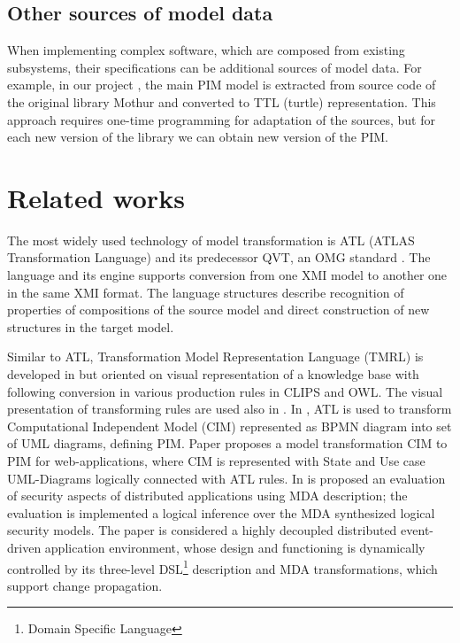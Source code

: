 \documentclass[conference]{IEEEtran}
\begin{document}

\subsection{Other sources of model data}
\label{sec:other-models}

When implementing complex software, which are composed from existing subsystems, their specifications can be additional sources of model data.  For example, in our project \cite{bit2019}, the main PIM model is extracted from source code of the original library Mothur and converted to TTL (turtle) representation.  This approach requires one-time programming for adaptation of the sources, but for each new version of the library we can obtain new version of the PIM.  %



\section{Related works}

The most widely used technology of model transformation is ATL (ATLAS Transformation Language) \cite{atl} and its predecessor QVT, an OMG standard \cite{QVT}.  The language and its engine supports conversion from one XMI model to another one in the same XMI format.  The language structures describe recognition of properties of compositions of the source model and direct construction of new structures in the target model.

Similar to ATL, Transformation Model Representation Language (TMRL) is developed in \cite{nikita} but oriented on visual representation of a knowledge base with following conversion in various production rules in CLIPS and OWL.  The visual presentation of transforming rules are used also in \cite{GT}.  In \cite{azis}, ATL is used to transform Computational Independent Model (CIM) represented as BPMN diagram into set of UML diagrams, defining PIM. Paper \cite{Rhazali} proposes a model transformation CIM to PIM for web-applications, where CIM is represented with State and Use case UML-Diagrams logically connected with ATL rules.  In \cite{Hamid} is proposed an evaluation of security aspects of distributed applications using MDA description; the evaluation is implemented a logical inference over the MDA synthesized logical security models. The paper \cite{Zdun} is considered a highly decoupled distributed event-driven application environment, whose design and functioning is dynamically controlled by its three-level DSL\footnote{Domain Specific Language} description and MDA transformations, which support change propagation.
\end{document}
